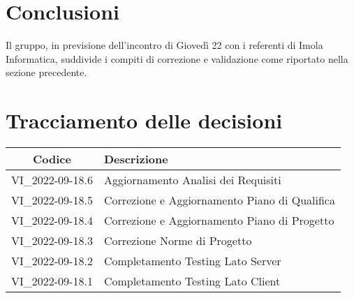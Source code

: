 \section{Conclusioni}
Il gruppo, in previsione dell'incontro di Giovedì 22 con i referenti di Imola Informatica, suddivide i compiti di correzione e validazione come riportato nella sezione precedente.
\newpage

\section*{Tracciamento delle decisioni}
	\renewcommand{\arraystretch}{1.8} %
	\begin{tabular}{ |c|l| }
		\hline
		\textbf{Codice} & \textbf{Descrizione} \\
    \hline
		VI\_2022-09-18.6 & Aggiornamento Analisi dei Requisiti\\ %
    \hline
		VI\_2022-09-18.5 & Correzione e Aggiornamento Piano di Qualifica\\ %
		\hline
		VI\_2022-09-18.4 & Correzione e Aggiornamento Piano di Progetto\\ %
    \hline
		VI\_2022-09-18.3 & Correzione Norme di Progetto\\ %
    \hline
		VI\_2022-09-18.2 & Completamento Testing Lato Server\\ %
    \hline
		VI\_2022-09-18.1 & Completamento Testing Lato Client \\ %
		\hline
	\end{tabular}
